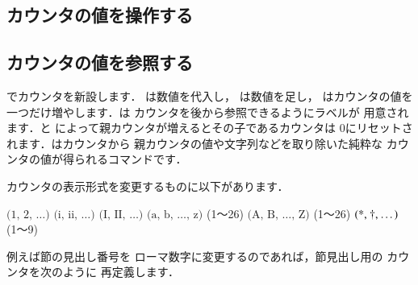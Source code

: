 \subsection{カウンタの値を操作する}
\begin{usage}
\setcounter{$\<カウンタ名>$}{$\<整数値>$}%
\addtocounter{$\<カウンタ名>$}{$\<整数値>$}%
\end{usage}

\subsection{カウンタの値を参照する}
\begin{usage}
\value{$\<カウンタ名>$} %
\end{usage}


でカウンタを新設します．
は数値を代入し，
は数値を足し，
はカウンタの値を
一つだけ増やします．は
カウンタを後から参照できるようにラベルが
用意されます．と 
によって親カウンタが増えるとその子であるカウンタは
0にリセットされます．はカウンタから
親カウンタの値や文字列などを取り除いた純粋な
カウンタの値が得られるコマンドです．

カウンタの表示形式を変更するものに以下があります．
\begin{usage}
\arabic   $\text{(1, 2, \ldots)}$
\roman    $\text{(i, ii, \ldots)}$
\Roman    $\text{({I}, {II}, \ldots)}$
\alph     $\text{({a}, {b}, \ldots, z)}$ (1〜26)
\Alph     $\text{({A}, {B}, \ldots, Z)}$ (1〜26)
\fnsymbol $\text{({*}, \textdagger, \ldots)}$ (1〜9)
\end{usage}

例えば節の見出し番号を
ローマ数字に変更するのであれば，節見出し用の
カウンタを次のように
再定義します．

\begin{intext}
\renewcommand{\thesection}{\Roman{section}}
\end{intext}

%
%
%
%
